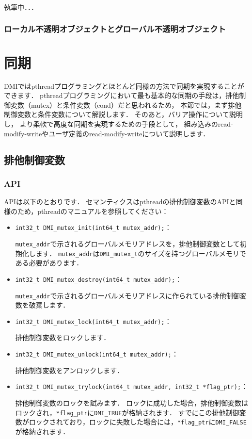 \documentclass[report,12pt]{jsbook}
\begin{document}
執筆中．．．

\subsection{ローカル不透明オブジェクトとグローバル不透明オブジェクト}

\chapter{同期}

DMIではpthreadプログラミングとほとんど同様の方法で同期を実現することができます．
pthreadプログラミングにおいて最も基本的な同期の手段は，排他制御変数（mutex）と条件変数（cond）だと思われるため，
本節では，まず排他制御変数と条件変数について解説します．
そのあと，バリア操作について説明し，
より柔軟で高度な同期を実現するための手段として，
組み込みのread-modify-writeやユーザ定義のread-modify-writeについて説明します．

\section{排他制御変数}

\subsection{API}

APIは以下のとおりです．
セマンティクスはpthreadの排他制御変数のAPIと同様のため，pthreadのマニュアルを参照してください：
\begin{itemize}
\item \texttt{int32\_t DMI\_mutex\_init(int64\_t mutex\_addr);}：
  
  \texttt{mutex\_addr}で示されるグローバルメモリアドレスを，排他制御変数として初期化します．
  \texttt{mutex\_addr}は\texttt{DMI\_mutex\_t}のサイズを持つグローバルメモリである必要があります．
\item \texttt{int32\_t DMI\_mutex\_destroy(int64\_t mutex\_addr);}：
  
  \texttt{mutex\_addr}で示されるグローバルメモリアドレスに作られている排他制御変数を破棄します．
\item \texttt{int32\_t DMI\_mutex\_lock(int64\_t mutex\_addr);}：
  
  排他制御変数をロックします．
\item \texttt{int32\_t DMI\_mutex\_unlock(int64\_t mutex\_addr);}：
  
  排他制御変数をアンロックします．
\item \texttt{int32\_t DMI\_mutex\_trylock(int64\_t mutex\_addr, int32\_t *flag\_ptr);}：
  
  排他制御変数のロックを試みます．
  ロックに成功した場合，排他制御変数はロックされ，\texttt{*flag\_ptr}に\texttt{DMI\_TRUE}が格納されます．
  すでにこの排他制御変数がロックされており，ロックに失敗した場合には，\texttt{*flag\_ptr}に\texttt{DMI\_FALSE}が格納されます．
\end{itemize}
\end{document}
